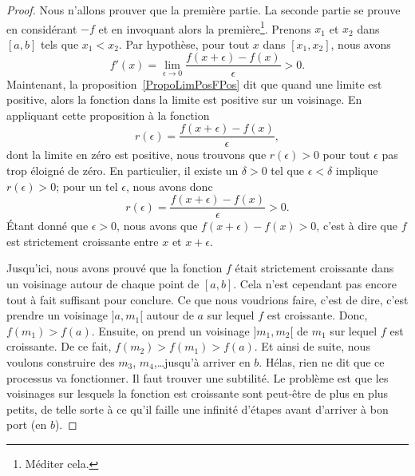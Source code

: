 \begin{proof}
    Nous n'allons prouver que la première partie. La seconde partie se prouve en considérant $-f$ et en invoquant alors la première\footnote{Méditer cela.}. Prenons $x_1$ et $x_2$ dans $[a,b]$ tels que $x_1<x_2$. Par hypothèse, pour tout $x$ dans $[x_1,x_2]$, nous avons
    \begin{equation}
        f'(x)=\lim_{\epsilon\to 0}\frac{ f(x+\epsilon)-f(x) }{\epsilon} >0.
    \end{equation}
    Maintenant, la proposition~\ref{PropoLimPosFPos} dit que quand une limite est positive, alors la fonction dans la limite est positive sur un voisinage. En appliquant cette proposition à la fonction
    \begin{equation}
        r(\epsilon)=\frac{ f(x+\epsilon)-f(x) }{ \epsilon },
    \end{equation}
    dont la limite en zéro est positive, nous trouvons que $r(\epsilon)>0$ pour tout $\epsilon$ pas trop éloigné de zéro. En particulier, il existe un $\delta>0$ tel que $\epsilon<\delta$ implique $r(\epsilon)>0$; pour un tel $\epsilon$, nous avons donc
    \begin{equation}
        r(\epsilon)=\frac{ f(x+\epsilon)-f(x) }{ \epsilon }>0.
    \end{equation}
    Étant donné que $\epsilon>0$, nous avons que $f(x+\epsilon)-f(x)>0$, c'est à dire que $f$ est strictement croissante entre $x$ et $x+\epsilon$.

    Jusqu'ici, nous avons prouvé que la fonction $f$ était strictement croissante dans un voisinage autour de chaque point de $[a,b]$. Cela n'est cependant pas encore tout à fait suffisant pour conclure. Ce que nous voudrions faire, c'est de dire, c'est prendre un voisinage $]a,m_1[$ autour de $a$ sur lequel $f$ est croissante. Donc, $f(m_1)>f(a)$. Ensuite, on prend un voisinage $]m_1,m_2[$ de $m_1$ sur lequel $f$ est croissante. De ce fait, $f(m_2)>f(m_1)>f(a)$. Et ainsi de suite, nous voulons construire des $m_3$, $m_4$,\ldots jusqu'à arriver en $b$. Hélas, rien ne dit que ce processus va fonctionner. Il faut trouver une subtilité. Le problème est que les voisinages sur lesquels la fonction est croissante sont peut-être de plus en plus petits, de telle sorte à ce qu'il faille une infinité d'étapes avant d'arriver à bon port (en $b$).


\end{proof}
